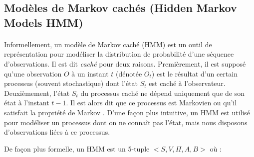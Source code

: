 \subsection{Modèles de Markov cachés (Hidden Markov Models HMM)}
\paragraph{}
Informellement, un modèle de Markov caché (HMM) est un outil de représentation pour modéliser la distribution de probabilité d'une séquence d'observations. Il est dit \textit{caché} pour deux raisons. Premièrement, il est supposé qu'une observation $O$ à un instant $t$ (dénotée $O_t$)  est le résultat d'un certain processus (souvent stochastique) dont l'état $S_t$ est caché à l'observateur. Deuxièmement, l'état $S_t$ du processus caché ne dépend uniquement que de son état à l'instant $t-1$. Il est alors dit que ce processus est Markovien ou qu'il satisfait la propriété de Markov \citep{hmm_intro,markov_process}. D'une façon plus intuitive, un HMM  est utilisé pour modéliser un processus dont on ne connaît pas l'état, mais nous disposons d'observations liées à ce processus.
\par De façon plus formelle, un HMM est un 5-tuple $<S,V,\Pi,A,B>$ \citep{hmm_formal} où :
